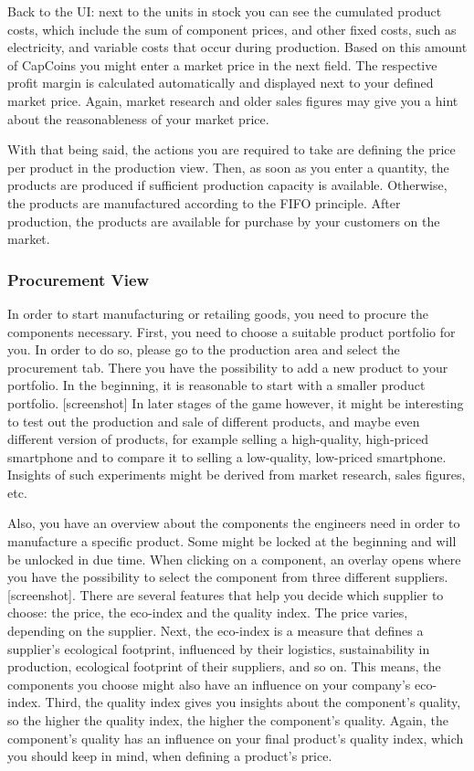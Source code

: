Back to the UI: next to the units in stock you can see the cumulated product costs, which include the sum of component prices, and other fixed costs, such as electricity, and variable costs that occur during production. Based on this amount of CapCoins you might enter a market price in the next field. The respective profit margin is calculated automatically and displayed next to your defined market price. Again, market research and older sales figures may give you a hint about the reasonableness of your market price. 

With that being said, the actions you are required to take are defining the price per product in the production view. Then, as soon as you enter a quantity, the products are produced if sufficient production capacity is available. Otherwise, the products are manufactured according to the FIFO principle. After production, the products are available for purchase by your customers on the market.

\subsubsection{Procurement View}
\label{sub:ProcurementView}
In order to start manufacturing or retailing goods, you need to procure the components necessary. First, you need to choose a suitable product portfolio for you. In order to do so, please go to the production area and select the procurement tab. There you have the possibility to add a new product to your portfolio. In the beginning, it is reasonable to start with a smaller product portfolio. [screenshot] In later stages of the game however, it might be interesting to test out the production and sale of different products, and maybe even different version of products, for example selling a high-quality, high-priced smartphone and to compare it to selling a low-quality, low-priced smartphone. Insights of such experiments might be derived from market research, sales figures, etc.

Also, you have an overview about the components the engineers need in order to manufacture a specific product. Some might be locked at the beginning and will be unlocked in due time. When clicking on a component, an overlay opens where you have the possibility to select the component from three different suppliers. [screenshot]. There are several features that help you decide which supplier to choose: the price, the eco-index and the quality index. The price varies, depending on the supplier. Next, the eco-index is a measure that defines a supplier’s ecological footprint, influenced by their logistics, sustainability in production, ecological footprint of their suppliers, and so on. This means, the components you choose might also have an influence on your company’s eco-index. Third, the quality index gives you insights about the component’s quality, so the higher the quality index, the higher the component’s quality. Again, the component’s quality has an influence on your final product’s quality index, which you should keep in mind, when defining a product’s price.

